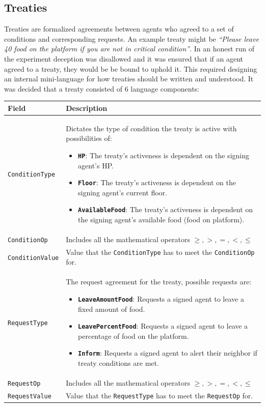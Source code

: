 \subsection{Treaties}
Treaties are formalized agreements between agents who agreed to a set of conditions and corresponding requests. An example treaty might be \textit{“Please leave 40 food on the platform if you are not in critical condition”}. In an honest run of the experiment deception was disallowed and it was ensured that if an agent agreed to a treaty, they would be be bound to uphold it. \newline
This required designing an internal mini-language for how treaties should be written and understood. It was decided that a treaty consisted of 6 language components:
\begin{center}
\begin{tabular}{p{4cm}p{11.5cm}}
 \hline
 \textbf{Field} & \textbf{Description} \\ [0.5ex] 
 \hline\hline
 \texttt{ConditionType} & 
 Dictates the type of condition the treaty is active with possibilities of:
 \begin{itemize}
    \item \textbf{\texttt{HP}}: The treaty's activeness is dependent on the signing agent's HP.
    \item \textbf{\texttt{Floor}}: The treaty's activeness is dependent on the signing agent's current floor.
    \item \textbf{\texttt{AvailableFood}}: The treaty's activeness is dependent on the signing agent's available food (food on platform).
\end{itemize} \\
 \hline
 \texttt{ConditionOp} & Includes all the mathematical operators $\geq, >, =, <, \leq$ \\ 
 \hline
 \texttt{ConditionValue} & Value that the \texttt{ConditionType} has to meet the \texttt{ConditionOp} for. \\ 
 \hline
 \texttt{RequestType} & The request agreement for the treaty, possible requests are:
 \begin{itemize}
    \item \textbf{\texttt{LeaveAmountFood}}: Requests a signed agent to leave a fixed amount of food.
    \item \textbf{\texttt{LeavePercentFood}}: Requests a signed agent to leave a percentage of food on the platform.
    \item \textbf{\texttt{Inform}}: Requests a signed agent to alert their neighbor if treaty conditions are met.
\end{itemize} \\ 
 \hline
 \texttt{RequestOp} & Includes all the mathematical operators $\geq, >, =, <, \leq$ \\ 
 \hline
 \texttt{RequestValue} & Value that the \texttt{RequestType} has to meet the \texttt{RequestOp} for. \\ 
 \hline
\end{tabular}
\end{center}
